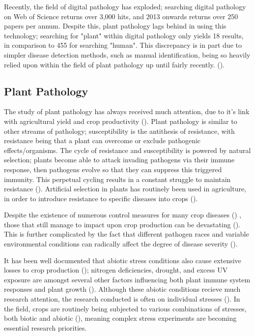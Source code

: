 \documentclass[../../Paper.tex]{subfiles}
\begin{document}
  
    Recently, the field of digital pathology has exploded; searching
    digital pathology on Web of Science returns over 3,000 hits, and 2013 onwards
    returns over 250 papers per annum. Despite this, plant pathology lags behind in using this technology; searching for "plant" within digital pathology only yields 18 results, in comparison to 455 for searching "human". This discrepancy is in part due to simpler disease detection methods, such as manual identification, being so heavily relied upon within the field of plant pathology up until fairly recently.  (\cite{lowe_hyperspectral_2017}).
   
\subsection*{Plant Pathology}

  
    The study of plant pathology has always received much attention, due to it's link with
    agricultural yield and crop productivity (\cite{donatelli_modelling_2017, waller_endophytic_2005}). 
    Plant pathology is similar to other streams of pathology; susceptibility is the antithesis of 
    resistance, with resistance being that a plant can overcome or exclude pathogenic effects/organisms.
    The cycle of resistance and susceptibility is powered by natural selection; plants become able to attack
    invading pathogens via their immune response, then pathogens evolve so that they can suppress 
    this triggered immunity. This perpetual cycling results in a constant struggle to maintain resistance 
    (\cite{lapin_susceptibility_2013, pel_microbial_2013, zheng_coronatine_2012}). Artificial
    selection in plants has routinely been used in agriculture, in order to introduce resistance to specific
    diseases into crops (\cite{dennis_genetic_2008}).
    
    Despite the existence of numerous control measures for many crop diseases (\cite{wood_sustainable_1996})
    , those that still manage to impact upon crop production can be devastating 
    (\cite{mccook_global_2006,woodham-smith_great_1962}). This is further complicated by the fact that different pathogen races and variable environmental conditions can radically affect the degree of disease severity (\cite{dangl_plant_2006, suzuki_reactive_2006}).
    
    It has been well documented that abiotic stress conditions also cause extensive losses to crop production (\cite{mittler_abiotic_2006}); nitrogen deficiencies, drought, and excess UV exposure are amongst several other factors influencing both plant immune system responses and plant growth (\cite{karimi_application_2006,santos_path_2018}). Although these abiotic conditions recieve much research attention, the research conducted is often on individual stresses (\cite{zhao_nitrogen_2005,santos_path_2018}). In the field, crops are routinely being subjected to various combinations of stresses, both biotic and abiotic (\cite{mittler_abiotic_2006}), meaning complex stress experiments are becoming essential research priorities.
    
\end{document}
